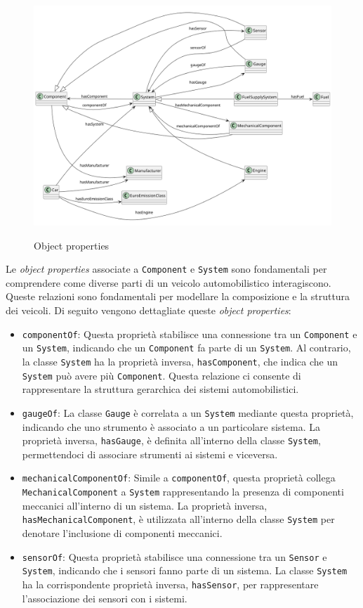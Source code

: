 \begin{figure}
    \caption{Object properties}
    \includegraphics[width=\textwidth]{figures/carpedia-object-properties.png}
    \label{fig:carpedia-object-properties}
\end{figure}

Le \textit{object properties} associate a \texttt{Component} e \texttt{System} sono fondamentali per comprendere come diverse parti di un veicolo automobilistico interagiscono. Queste relazioni sono fondamentali per modellare la composizione e la struttura dei veicoli. Di seguito vengono dettagliate queste \textit{object properties}:

\begin{itemize}
    \item \texttt{componentOf}: Questa proprietà stabilisce una connessione tra un \texttt{Component} e un \texttt{System}, indicando che un \texttt{Component} fa parte di un \texttt{System}. Al contrario, la classe \texttt{System} ha la proprietà inversa, \texttt{hasComponent}, che indica che un \texttt{System} può avere più \texttt{Component}. Questa relazione ci consente di rappresentare la struttura gerarchica dei sistemi automobilistici.
    \item \texttt{gaugeOf}: La classe \texttt{Gauge} è correlata a un \texttt{System} mediante questa proprietà, indicando che uno strumento è associato a un particolare sistema. La proprietà inversa, \texttt{hasGauge}, è definita all'interno della classe \texttt{System}, permettendoci di associare strumenti ai sistemi e viceversa.
    \item \texttt{mechanicalComponentOf}: Simile a \texttt{componentOf}, questa proprietà collega \texttt{MechanicalComponent} a \texttt{System} rappresentando la presenza di componenti meccanici all'interno di un sistema. La proprietà inversa, \texttt{hasMechanicalComponent}, è utilizzata all'interno della classe \texttt{System} per denotare l'inclusione di componenti meccanici.
    \item \texttt{sensorOf}: Questa proprietà stabilisce una connessione tra un \texttt{Sensor} e \texttt{System}, indicando che i sensori fanno parte di un sistema. La classe \texttt{System} ha la corrispondente proprietà inversa, \texttt{hasSensor}, per rappresentare l'associazione dei sensori con i sistemi.
\end{itemize}

